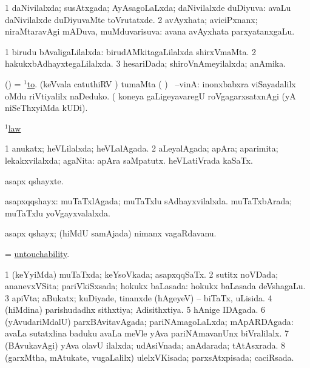 \bentry
{} 
\gl{\gu}
\expl{}
\bmng
\bnum
\num{1} daNivilalxda; susAtxgada; AyAsagoLaLxda; daNivilalxde duDiyuva:  avaLu daNivilalxde duDiyuvaMte toVrutatxde. 
\num{2} avAyxhata; aviciPxnanx; niraMtaravAgi mADuva, muMduvarisuva:  avana avAyxhata parxyatanxgaLu. 
\enum
\emng
\eentry

\bentry
{} 
\gl{\gu}
\expl{}
\bmng
\bnum
\num{1} birudu bAvaligaLilalxda:  birudAMkitagaLilalxda shirxVmaMta. 
\num{2} hakukxbAdhayxtegaLilalxda. 
\num{3} hesariDada; shiroVnAmeyilalxda; anAmika. 
\enum
\emng
\eentry

\bentry
{} 
\gl{\upa}
\expl{}
\bmng
(\pArxparx) = \hyperref{kandict_t.pdf}{T}{to(1)}{$^1$to}. (keVvala catuthiRV \parx) tumaMta ( ) \parx\ --vinA:  inonxbabxra viSayadalilx oMdu riVtiyalilx naDeduko.  (  koneya gaLigeyavaregU roVgagarxsatxnAgi (yA niSeThxyiMda kUDi). 
\emng

\noindent
\gl{\pagu}
\expl{}
\bmng
{} \hyperref{kandict_l.pdf}{L}{law(1) nuga(1)}{$^1$law}  
\emng
\eentry

\bentry
{} 
\gl{\gu}
\expl{}
\bmng
\bnum
\num{1} anukatx; heVLilalxda; heVLalAgada. 
\num{2} aLeyalAgada; apAra; aparimita; lekakxvilalxda; agaNita:  apAra saMpatutx.  heVLatiVrada kaSaTx. 
\enum
\emng
\eentry

\bentry
{} 
\gl{\nA}
\expl{}
\bmng
asapx qshayxte. 
\emng
\eentry

\bentry
{} 
\gl{\gu}
\expl{}
\bmng
asapxqqshayx: 
\banum
{} muTaTxlAgada; muTaTxlu sAdhayxvilalxda. 
 muTaTxbArada; muTaTxlu yoVgayxvalalxda. 
\eanum
\emng
\eentry

\bentry
{} 
\gl{\nA}
\expl{}
\bmng
asapx qshayx; (hiMdU samAjada) nimanx vagaRdavanu. 
\emng
\eentry

\bentry
{} 
\gl{\nA}
\expl{}
\bmng
= \hyperlink{untouchability}{untouchability}. 
\emng
\eentry

\bentry
{} 
\gl{\gu}
\expl{}
\bmng
\bnum
\num{1} (keYyiMda) muTaTxda; keYsoVkada; asapxqqSaTx. 
\num{2} sutitx noVDada; ananevxVSita; pariVkiSxsada; hokukx baLasada:  hokukx baLasada deVshagaLu. 
\num{3} apiVta; aBukatx; kuDiyade, tinanxde (hAgeyeV) -- biTaTx, uLisida. 
\num{4} (hiMdina) parishudadhx sithxtiya; Adisithxtiya. 
\num{5} hAnige IDAgada. 
\num{6} (yAvudariMdalU) parxBAvitavAgada; pariNAmagoLaLxda; mApARDAgada:  avaLa sutatxlina baduku avaLa meVle yAva pariNAmavanUnx biVralilalx. 
\num{7} (BAvukavAgi) yAva olavU ilalxda; udAsiVnada; anAdarada; tAtAsxrada. 
\num{8} (garxMtha, mAtukate, \mo vugaLalilx) ulelxVKisada; parxsAtxpisada; caciRsada. 
\enum
\emng
\eentry

